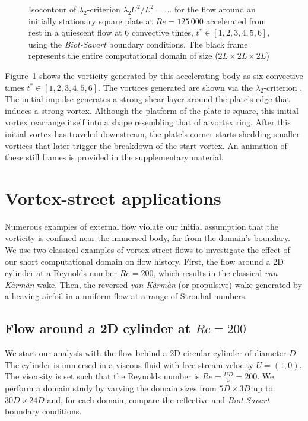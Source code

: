 \documentclass{article}
\begin{document}
\begin{figure}
\begin{subfigure}{.33\textwidth}
    \end{subfigure}
    \caption{Isocontour of $\lambda_2$-criterion $\lambda_2U^2/L^2=...$ for the flow around an initially stationary square plate at $Re=125\,000$ accelerated from rest in a quiescent flow at 6 convective times, $t^*\in [1,2,3,4,5,6]$, using the \emph{Biot-Savart} boundary conditions. The black frame represents the entire computational domain of size ($2L\times2L\times2L$)}
    \label{fig:disk_flow_3}
\end{figure}

Figure~\ref{fig:disk_flow_3} shows the vorticity generated by this accelerating body as six convective times $t^*\in[1,2,3,4,5,6]$. The vortices generated are shown via the $\lambda_2$-criterion \cite{JEong1995OnVortex}. The initial impulse generates a strong shear layer around the plate's edge that induces a strong vortex. Although the platform of the plate is square, this initial vortex rearrange itself into a shape resembling that of a vortex ring. After this initial vortex has traveled downstream, the plate's corner starts shedding smaller vortices that later trigger the breakdown of the start vortex. An animation of these still frames is provided in the supplementary material.

\section{Vortex-street applications}

Numerous examples of external flow violate our initial assumption that the vorticity is confined near the immersed body, far from the domain's boundary. We use two classical examples of vortex-street flows to investigate the effect of our short computational domain on flow history. First, the flow around a 2D cylinder at a Reynolds number $Re=200$, which results in the classical \emph{van K\`arm\`an} wake. Then, the reversed \emph{van K\`arm\`an} (or propulsive) wake generated by a heaving airfoil in a uniform flow at a range of Strouhal numbers.

\subsection{Flow around a 2D cylinder at $Re=200$}

We start our analysis with the flow behind a 2D circular cylinder of diameter $D$. The cylinder is immersed in a viscous fluid with free-stream velocity $U=(1,0)$. The viscosity is set such that the Reynolds number is $Re=\frac{UD}{\nu}=200$. We perform a domain study by varying the domain sizes from $5D\times3D$ up to $30D\times24D$ and, for each domain, compare the reflective and \emph{Biot-Savart} boundary conditions.
\end{document}
